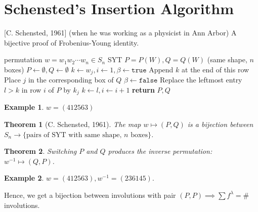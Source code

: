 \documentclass{report}
\newtheorem{theorem}{Theorem}[section]
\theoremstyle{definition}
\newtheorem{example}{Example}[section]
\theoremstyle{remark}
\numberwithin{equation}{section}
\begin{document}
\section{Schensted's Insertion Algorithm}
[C. Schensted, 1961] (when he was working as a physicist in Ann Arbor)
A bijective proof of Frobenius-Young identity.
\begin{algorithm}[h]
    \caption{Schensted's algorithm}
    \label{algo:schensted}
    \begin{algorithmic}[1]
        \Require permutation $w = w_1w_2\cdots w_n \in S_n$
        \Ensure SYT $P = P(W), Q = Q(W)$ (same shape, $n$ boxes)
            \State $P \gets \emptyset, Q \gets \emptyset$
            \State $k \gets w_j, i \gets 1, \beta \gets \texttt{true}$
                \State Append $k$ at the end of this row
                \State Place $j$ in the corresponding box of $Q$ 
                \State $\beta \gets \texttt{false}$
                \Else 
                \State Replace the leftmost entry $l > k$ in row $i$ of $P$ by $k_j$
                \State $k \gets l, i \gets i + 1$
                \EndIf 
            \EndWhile
            \EndFor
            \State \textbf{return} $P, Q$ 
        \EndFunction
    \end{algorithmic}
\end{algorithm}

\begin{example}
    $w = (412563)$
\end{example}

\begin{theorem}[C. Schensted, 1961]
    The map $w \mapsto (P, Q)$ is a \emph{bijection} between $S_n \to \{\text{pairs of SYT with same shape, $n$ boxes}\}$.
\end{theorem}
\begin{theorem}
    Switching $P$ and $Q$ produces the inverse permutation: $w^{-1} \mapsto (Q, P)$.
\end{theorem}
\begin{example}
    $w = (412563), w^{-1} = (236145)$.
\end{example}
Hence, we get a bijection between involutions with pair $(P, P) \implies \sum f^\lambda = \#$ involutions.
\end{document}
